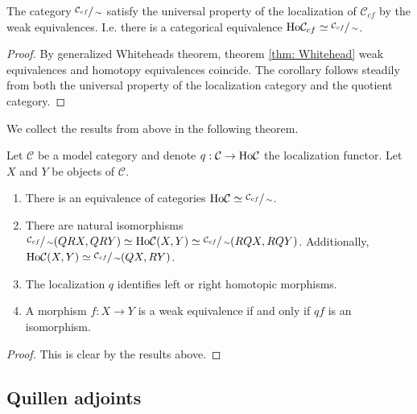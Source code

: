 \documentclass[../thesis.tex]{subfiles}
\begin{document}
            \begin{corollary}
                The category $\sfrac{\mathcal{C}_{cf}}{\sim}$ satisfy the universal property of the localization of $\mathcal{C}_{cf}$ by the weak equivalences. I.e. there is a categorical equivalence $\tt{Ho}\mathcal{C}_{cf} \simeq \sfrac{\mathcal{C}_{cf}}{\sim}$.
            \end{corollary}

            \begin{proof}
                By generalized Whiteheads theorem, theorem \ref{thm: Whitehead} weak equivalences and homotopy equivalences coincide. The corollary follows steadily from both the universal property of the localization category and the quotient category. 
            \end{proof}

            We collect the results from above in the following theorem.

            \begin{thm}\label{thm: Fundamental-thm-model}
                Let $\mathcal{C}$ be a model category and denote $q: \mathcal{C} \rightarrow \tt{Ho}\mathcal{C}$ the localization functor. Let $X$ and $Y$ be objects of $\mathcal{C}$.
                \begin{enumerate}
                    \item There is an equivalence of categories $\tt{Ho}\mathcal{C}\simeq \sfrac{\mathcal{C}_{cf}}{\sim}$.
                    \item There are natural isomorphisms $\sfrac{\mathcal{C}_{cf}}{\sim}(QRX,QRY)\simeq \tt{Ho}\mathcal{C}(X, Y) \simeq \sfrac{\mathcal{C}_{cf}}{\sim}(RQX, RQY)$. Additionally, $\tt{Ho}\mathcal{C}(X, Y)\simeq \sfrac{\mathcal{C}_{cf}}{\sim}(QX, RY)$.
                    \item The localization $q$ identifies left or right homotopic morphisms.
                    \item A morphism $f: X \rightarrow Y$ is a weak equivalence if and only if $qf$ is an isomorphism.
                \end{enumerate}
            \end{thm}

            \begin{proof}
                This is clear by the results above.
            \end{proof}

        \subsection{Quillen adjoints}
\end{document}

